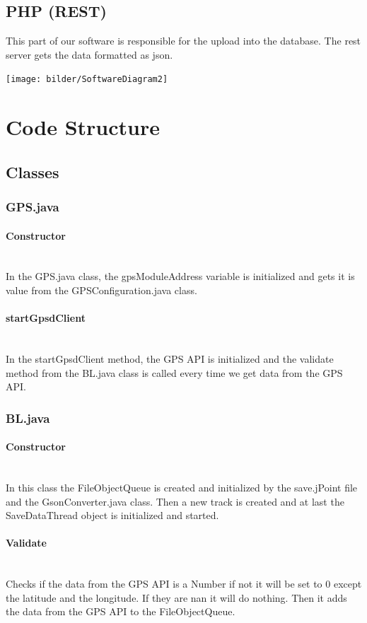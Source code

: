 \subsection{PHP (REST)}
This part of our software is responsible for the upload into the database. The \gls{rest} server gets the data formatted as \gls{json}.
\begin{center}
\texttt{[image: bilder/SoftwareDiagram2]}
\end{center} 
\section{Code Structure}
\subsection{Classes}
\subsubsection{GPS.java}
\paragraph{Constructor}\mbox{}\\
In the GPS.java class, the gpsModuleAddress variable is initialized and gets it is value from the GPSConfiguration.java class.
\paragraph{startGpsdClient}\mbox{}\\
In the startGpsdClient method, the GPS API is initialized and the validate method from the BL.java class is called every time we get data from the GPS API.
\subsubsection{BL.java}
\paragraph{Constructor}\mbox{}\\
In this class the FileObjectQueue is created and initialized by the save.jPoint file and the GsonConverter.java class. 
Then a new track is created and at last the SaveDataThread object is initialized and started.
\paragraph{Validate}\mbox{}\\
Checks if the data from the GPS API is a Number if not it will be set to 0 except the latitude and the longitude. If they are \gls{nan} it will do nothing. 
Then it adds the data from the GPS API to the FileObjectQueue.
